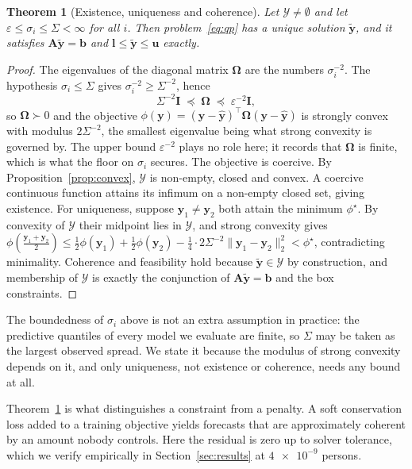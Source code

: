 \documentclass[11pt]{article}
\theoremstyle{plain}
\newtheorem{theorem}{Theorem}
\theoremstyle{definition}
\theoremstyle{remark}
\newcommand{\bA}{\bm{A}}
\newcommand{\by}{\bm{y}}
\newcommand{\bb}{\bm{b}}
\newcommand{\bOm}{\bm{\Omega}}
\newcommand{\yhat}{\hat{\by}}
\newcommand{\ytil}{\tilde{\by}}
\newcommand{\cY}{\mathcal{Y}}
\newif\ifrevisionmarkup
\newcommand{\new}[1]{\ifrevisionmarkup\textcolor{revision}{#1}\else#1\fi}
\begin{document}
\begin{theorem}[Existence, uniqueness and coherence]
\label{thm:unique}
Let $\cY \ne \emptyset$ and let \new{$\varepsilon \le \sigma_i \le \Sigma < \infty$} for all $i$. Then problem~\eqref{eq:qp} has a unique solution $\ytil$, and it satisfies $\bA\ytil = \bb$ and $\bm{l}\le\ytil\le\bm{u}$ exactly.
\end{theorem}
\begin{proof}
\new{The eigenvalues of the diagonal matrix $\bOm$ are the numbers $\sigma_i^{-2}$. The hypothesis $\sigma_i \le \Sigma$ gives $\sigma_i^{-2} \ge \Sigma^{-2}$, hence}
\new{\begin{equation}
\Sigma^{-2}\bm{I} \;\preceq\; \bOm \;\preceq\; \varepsilon^{-2}\bm{I},
\label{eq:omegabound}
\end{equation}}
\new{so $\bOm \succ 0$ and the objective $\phi(\by) = (\by-\yhat)^{\top}\bOm(\by-\yhat)$ is strongly convex with modulus $2\Sigma^{-2}$, the smallest eigenvalue being what strong convexity is governed by. The upper bound $\varepsilon^{-2}$ plays no role here; it records that $\bOm$ is finite, which is what the floor on $\sigma_i$ secures.} The objective is coercive. By Proposition~\ref{prop:convex}, $\cY$ is non-empty, closed and convex. A coercive continuous function attains its infimum on a non-empty closed set, giving existence. For uniqueness, suppose $\by_1 \ne \by_2$ both attain the minimum $\phi^\star$. By convexity of $\cY$ their midpoint lies in $\cY$, and strong convexity gives
$\phi\!\left(\tfrac{\by_1+\by_2}{2}\right) \le \tfrac{1}{2}\phi(\by_1) + \tfrac{1}{2}\phi(\by_2) - \tfrac{1}{4}\cdot 2\new{\Sigma^{-2}}\|\by_1-\by_2\|_2^2 < \phi^\star$,
contradicting minimality. Coherence and feasibility hold because $\ytil \in \cY$ by construction, and membership of $\cY$ is exactly the conjunction of $\bA\ytil=\bb$ and the box constraints.
\end{proof}

\new{The boundedness of $\sigma_i$ above is not an extra assumption in practice: the predictive quantiles of every model we evaluate are finite, so $\Sigma$ may be taken as the largest observed spread. We state it because the modulus of strong convexity depends on it, and only uniqueness, not existence or coherence, needs any bound at all.}

Theorem~\ref{thm:unique} is what distinguishes a constraint from a penalty. A soft conservation loss added to a training objective yields forecasts that are approximately coherent by an amount nobody controls. Here the residual is zero up to solver tolerance, which we verify empirically in Section~\ref{sec:results} at $\num{4e-9}$ persons.
\end{document}
